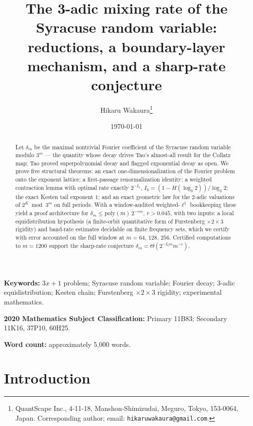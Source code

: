 \documentclass[11pt]{article}
\title{The 3-adic mixing rate of the Syracuse random variable:\\
reductions, a boundary-layer mechanism, and a sharp-rate conjecture}
\author{Hikaru Wakaura\thanks{QuantScape Inc., 4-11-18,
Manshon-Shimizudai, Meguro, Tokyo, 153-0064, Japan. Corresponding author;
email: \texttt{hikaruwakaura@gmail.com}.
}}
\date{\today}
\theoremstyle{definition}
\begin{document}
\maketitle

\begin{abstract}
Let $\delta_m$ be the maximal nontrivial Fourier coefficient of the
Syracuse random variable modulo $3^m$ --- the quantity whose decay drives
Tao's almost-all result for the Collatz map; Tao proved superpolynomial
decay and flagged exponential decay as open. We prove five structural
theorems: an exact one-dimensionalization of the Fourier
problem onto the exponent lattice; a first-passage renormalization
identity; a weighted contraction lemma with optimal rate exactly
$2^{-I_0}$, $I_0=(1-H(\log_3 2))/\log_3 2$; the exact Kesten tail
exponent $1$; and an exact geometric law for the $2$-adic valuations of
$2^K \bmod 3^m$ on full periods. With a window-audited weighted-$\ell^1$
bookkeeping these yield a proof architecture for
$\delta_m\le\mathrm{poly}(m)\,2^{-rm}$, $r>0.045$, with two inputs: a
local equidistribution hypothesis (a finite-orbit quantitative form of
Furstenberg $\times 2\times 3$ rigidity) and band-rate estimates decidable
on finite frequency sets, which we certify with error accounted on the
full window at $m=64$, $128$, $256$.
Certified computations to $m=1200$ support the sharp-rate conjecture
$\delta_m=\Theta(2^{-I_0m}m^{-c})$.
\end{abstract}

\noindent\textbf{Keywords:} $3x+1$ problem; Syracuse random variable;
Fourier decay; $3$-adic equidistribution; Kesten chain; Furstenberg
$\times 2\times 3$ rigidity; experimental mathematics.

\noindent\textbf{2020 Mathematics Subject Classification:} Primary 11B83;
Secondary 11K16, 37P10, 60H25.

\noindent\textbf{Word count:} approximately 5{,}000 words.

\section{Introduction}\label{sec:intro}
\end{document}
